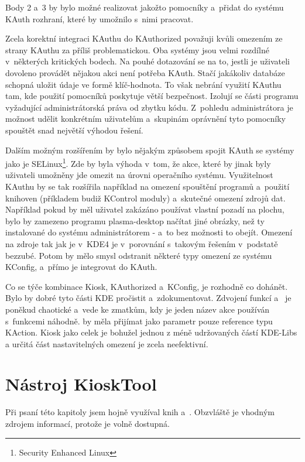 Body 2 a~3 by bylo možné realizovat jakožto pomocníky a~přidat do systému KAuth rozhraní, které by umožnilo s~nimi pracovat.

Zcela korektní integraci KAuthu do KAuthorized považuji kvůli omezením ze strany KAuthu za příliš problematickou. Oba systémy jsou velmi rozdílné v~některých kritických bodech. Na pouhé dotazování se na to, jestli je uživateli dovoleno provádět nějakou akci není potřeba KAuth. Stačí jakákoliv databáze schopná uložit údaje ve formě klíč-hodnota. To však nebrání využití KAuthu tam, kde použití pomocníků poskytuje větší bezpečnost. Izolují se části programu vyžadující administrátorská práva od zbytku kódu. Z~pohledu administrátora je možnost udělit konkrétním uživatelům a~skupinám oprávnění tyto pomocníky spouštět snad největší výhodou řešení.

Dalším možným rozšířením by bylo nějakým způsobem spojit KAuth se systémy jako je SELinux\footnote{Security Enhanced Linux}. Zde by byla výhoda v~tom, že akce, které by jinak byly uživateli umožněny jde omezit na úrovni operačního systému. Využitelnost KAuthu by se tak rozšířila například na omezení spouštění programů a~použití knihoven (příkladem budiž KControl moduly) a~skutečné omezení zdrojů dat. Například pokud by měl uživatel zakázáno používat vlastní pozadí na plochu, bylo by zamezeno programu plasma-desktop načítat jiné obrázky, než ty instalované do systému administrátorem - a~to bez možnosti to obejít. Omezení na zdroje tak jak je v~KDE4 je v~porovnání s~takovým řešením v~podstatě bezzubé. Potom by mělo smysl odstranit některé typy omezení ze systému KConfig, a~přímo je integrovat do KAuth.

Co se týče kombinace Kiosk, KAuthorized a~KConfig, je rozhodně co dohánět. Bylo by dobré tyto části KDE pročistit a~zdokumentovat. Zdvojení funkcí  a~ je poněkud chaotické a~vede ke zmatkům, kdy je jeden název akce používán s~funkcemi náhodně.  by měla přijímat jako parametr pouze reference typu KAction. Kiosk jako celek je bohužel jednou z méně udržovaných částí KDE-Libs a určitá část nastavitelných omezení je zcela neefektivní.

\chapter{Nástroj KioskTool}
Při psaní této kapitoly jsem hojně využíval knih \cite{StarchQt4} a~\cite{Ezust}. Obzvláště \cite{Ezust} je vhodným zdrojem informací, protože je volně dostupná.


